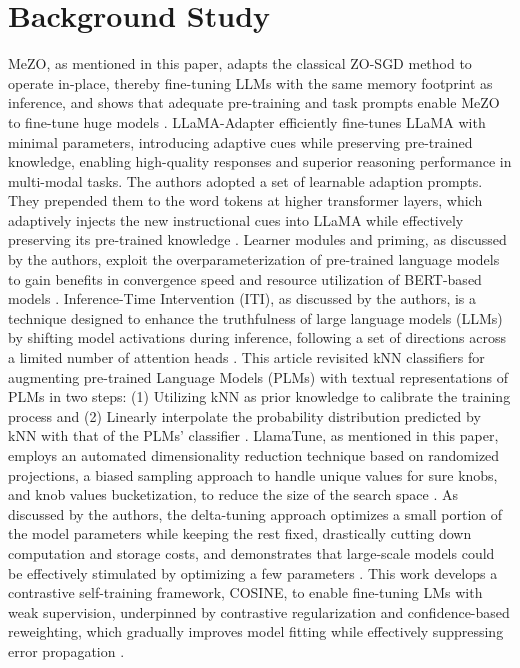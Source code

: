 \documentclass[sigconf]{acmart}
\begin{document}
\section{Background Study}
MeZO, as mentioned in this paper, adapts the classical ZO-SGD method to operate in-place, thereby fine-tuning LLMs with the same memory footprint as inference, and shows that adequate pre-training and task prompts enable MeZO to fine-tune huge models \cite{malladi2024fine}. LLaMA-Adapter efficiently fine-tunes LLaMA with minimal parameters, introducing adaptive cues while preserving pre-trained knowledge, enabling high-quality responses and superior reasoning performance in multi-modal tasks. The authors adopted a set of learnable adaption prompts. They prepended them to the word tokens at higher transformer layers, which adaptively injects the new instructional cues into LLaMA while effectively preserving its pre-trained knowledge \cite{zhang2023llama}. Learner modules and priming, as discussed by the authors, exploit the overparameterization of pre-trained language models to gain benefits in convergence speed and resource utilization of BERT-based models \cite{vucetic2022efficient}. Inference-Time Intervention (ITI), as discussed by the authors, is a technique designed to enhance the truthfulness of large language models (LLMs) by shifting model activations during inference, following a set of directions across a limited number of attention heads \cite{li2023inference}. This article revisited kNN classifiers for augmenting pre-trained Language Models (PLMs) with textual representations of PLMs in two steps: (1) Utilizing kNN as prior knowledge to calibrate the training process and (2) Linearly interpolate the probability distribution predicted by kNN with that of the PLMs' classifier \cite{li2023revisiting}. LlamaTune, as mentioned in this paper, employs an automated dimensionality reduction technique based on randomized projections, a biased sampling approach to handle unique values for sure knobs, and knob values bucketization, to reduce the size of the search space \cite{kanellis2022llamatune}. As discussed by the authors, the delta-tuning approach optimizes a small portion of the model parameters while keeping the rest fixed, drastically cutting down computation and storage costs, and demonstrates that large-scale models could be effectively stimulated by optimizing a few parameters \cite{antonello2020selecting}. This work develops a contrastive self-training framework, COSINE, to enable fine-tuning LMs with weak supervision, underpinned by contrastive regularization and confidence-based reweighting, which gradually improves model fitting while effectively suppressing error propagation \cite{yu2020fine}.
\end{document}
